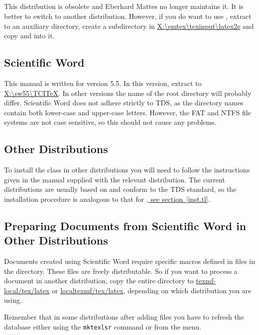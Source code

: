 \documentclass[12pt]{article}
\begin{document}
\subsection{\emTeX}\label{inst.emtex} This distribution is obsolete and Eberhard Mattes no longer
maintains it. It is better to switch to another distribution. However, if you do want to use
\emTeX, extract  to an auxiliary directory, create a  subdirectory
in
\url{X:\emtex\texinput\latex2e} and copy  and  into it.

\subsection{Scientific Word}\label{inst.sciword} This manual is written for version 5.5. In this
version, extract  to \url{X:\sw55\TCITeX}. In other versions the name of the root
directory will probably differ. Scientific Word does not adhere strictly to TDS, as the directory
names contain both lower-case and upper-case letters. However, the FAT and NTFS file systems are
not case sensitive, so this should not cause any problems.
	
\subsection{Other Distributions}\label{inst.other} To install the  class in other
distributions you will need to follow the instructions given in the manual supplied with the
relevant distribution. The current distributions are usually based on  and conform to the
TDS standard, so the installation procedure is analogous to that for \hyperref[inst.tl]{\TeXLive,
see section~\ref*{inst.tl}}.

\subsection{Preparing Documents from Scientific Word in Other
Distributions}\label{sciword.elsewhere} Documents created using Scientific Word require specific
macros defined in files in the  directory. These files are freely distributable. So if
you want to process a document in another distribution, copy the entire directory to
\url{texmf-local/tex/latex} or \url{localtexmf/tex/latex}, depending on which distribution you are
using.

\pozor Remember that in some distributions after adding files you have to refresh the database
either using the \texttt{mktexlsr} command or from the menu.
\end{document}
